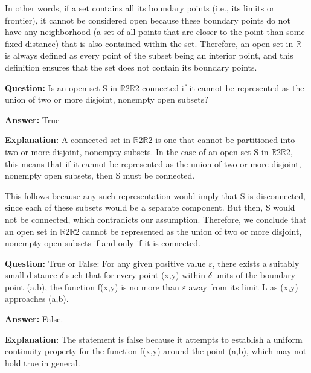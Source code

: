 \documentclass{article}
\begin{document}
In other words, if a set contains all its boundary points (i.e., its limits or frontier), it cannot be considered open because these boundary points do not have any neighborhood (a set of all points that are closer to the point than some fixed distance) that is also contained within the set. Therefore, an open set in \ensuremath{\mathbb{R}}{\texttwosuperior} is always defined as every point of the subset being an interior point, and this definition ensures that the set does not contain its boundary points.
                
                \vspace{0.5cm} 
        
            
                \textbf {Question:} Is an open set S in \ensuremath{\mathbb{R}}2\ensuremath{\mathbb{R}}2 connected if it cannot be represented as the union of two or more disjoint, nonempty open subsets?
                
                \textbf{Answer:} True

                \textbf{Explanation:} A connected set in \ensuremath{\mathbb{R}}2\ensuremath{\mathbb{R}}2 is one that cannot be partitioned into two or more disjoint, nonempty subsets. In the case of an open set S in \ensuremath{\mathbb{R}}2\ensuremath{\mathbb{R}}2, this means that if it cannot be represented as the union of two or more disjoint, nonempty open subsets, then S must be connected.

This follows because any such representation would imply that S is disconnected, since each of these subsets would be a separate component. But then, S would not be connected, which contradicts our assumption. Therefore, we conclude that an open set in \ensuremath{\mathbb{R}}2\ensuremath{\mathbb{R}}2 cannot be represented as the union of two or more disjoint, nonempty open subsets if and only if it is connected.
                
                \vspace{0.5cm} 
        
            
                \textbf {Question:} True or False: For any given positive value \ensuremath{\varepsilon}, there exists a suitably small distance \ensuremath{\delta} such that for every point (x,y) within \ensuremath{\delta} units of the boundary point (a,b), the function f(x,y) is no more than \ensuremath{\varepsilon} away from its limit L as (x,y) approaches (a,b).
                
                \textbf{Answer:} False.

                \textbf{Explanation:} The statement is false because it attempts to establish a uniform continuity property for the function f(x,y) around the point (a,b), which may not hold true in general.
\end{document}
